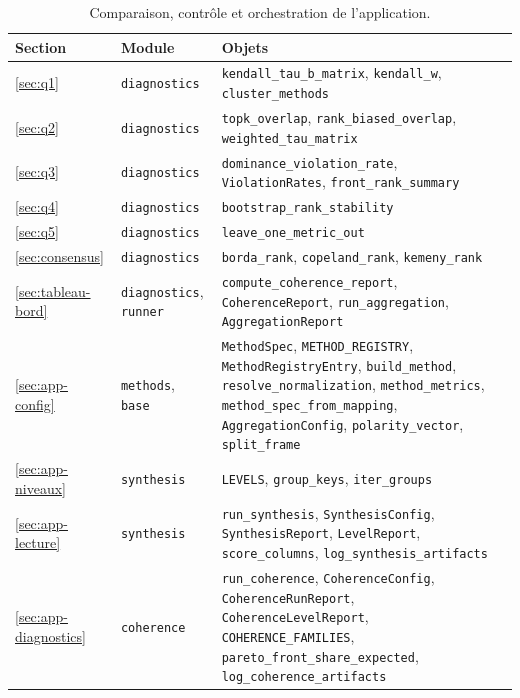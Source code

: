 \documentclass[11pt,a4paper]{article}
\theoremstyle{definition}
\theoremstyle{remark}
\begin{document}
\bigskip

\begin{table}[htbp]
  \centering
  \small
  \renewcommand{\arraystretch}{1.2}
  \begin{tabularx}{\textwidth}{@{}l l Y@{}}
    \toprule
    \textbf{Section} & \textbf{Module} & \textbf{Objets} \\
    \midrule
    \ref{sec:q1} & \texttt{diagnostics}
      & \texttt{kendall\_tau\_b\_matrix}, \texttt{kendall\_w},
        \texttt{cluster\_methods} \\
    \ref{sec:q2} & \texttt{diagnostics}
      & \texttt{topk\_overlap}, \texttt{rank\_biased\_overlap},
        \texttt{weighted\_tau\_matrix} \\
    \ref{sec:q3} & \texttt{diagnostics}
      & \texttt{dominance\_violation\_rate}, \texttt{ViolationRates},
        \texttt{front\_rank\_summary} \\
    \ref{sec:q4} & \texttt{diagnostics}
      & \texttt{bootstrap\_rank\_stability} \\
    \ref{sec:q5} & \texttt{diagnostics}
      & \texttt{leave\_one\_metric\_out} \\
    \ref{sec:consensus} & \texttt{diagnostics}
      & \texttt{borda\_rank}, \texttt{copeland\_rank}, \texttt{kemeny\_rank} \\
    \ref{sec:tableau-bord} & \texttt{diagnostics}, \texttt{runner}
      & \texttt{compute\_coherence\_report}, \texttt{CoherenceReport},
        \texttt{run\_aggregation}, \texttt{AggregationReport} \\
    \addlinespace
    \ref{sec:app-config} & \texttt{methods}, \texttt{base}
      & \texttt{MethodSpec}, \texttt{METHOD\_REGISTRY}, \texttt{MethodRegistryEntry},
        \texttt{build\_method}, \texttt{resolve\_normalization},
        \texttt{method\_metrics}, \texttt{method\_spec\_from\_mapping},
        \texttt{AggregationConfig}, \texttt{polarity\_vector}, \texttt{split\_frame} \\
    \ref{sec:app-niveaux} & \texttt{synthesis}
      & \texttt{LEVELS}, \texttt{group\_keys}, \texttt{iter\_groups} \\
    \ref{sec:app-lecture} & \texttt{synthesis}
      & \texttt{run\_synthesis}, \texttt{SynthesisConfig}, \texttt{SynthesisReport},
        \texttt{LevelReport}, \texttt{score\_columns},
        \texttt{log\_synthesis\_artifacts} \\
    \ref{sec:app-diagnostics} & \texttt{coherence}
      & \texttt{run\_coherence}, \texttt{CoherenceConfig},
        \texttt{CoherenceRunReport}, \texttt{CoherenceLevelReport},
        \texttt{COHERENCE\_FAMILIES}, \texttt{pareto\_front\_share\_expected},
        \texttt{log\_coherence\_artifacts} \\
    \bottomrule
  \end{tabularx}
  \caption{Comparaison, contrôle et orchestration de l'application.}
  \label{tab:code-3}
\end{table}
\end{document}
